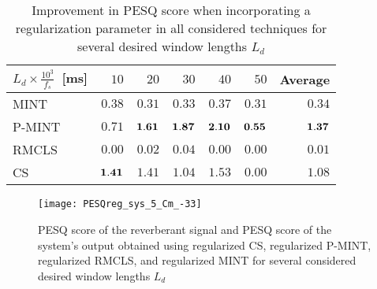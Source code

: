 \documentclass{article}
\begin{document}
\begin{table}[t!]
\footnotesize
\centering
\caption{Improvement in PESQ score when incorporating a regularization parameter in all considered techniques for several desired window lengths $L_d$}
\label{tbl: deltapesq}
 \begin{tabular}{|l|r|r|r|r|r|r|}
   \hline
   {\footnotesize $L_d \times \frac{10^{3}}{f_s}$~[ms] }& $10$ & $20$ & $30$ & $40$ & $50$ & Average \\ \hline
   MINT & $0.38$ & $0.31$ & $0.33$ & $0.37$ & $0.31$ & $0.34$ \\ \hline
   P-MINT & $0.71$ & $\bf{1.61}$ & $\bf{1.87}$ & $\bf{2.10}$ & $\bf{0.55}$ & $\bf{1.37}$ \\ \hline
   RMCLS & $0.00$ & $0.02$ & $0.04$ & $0.00$ & $0.00$ & $0.01$ \\ \hline
   CS & $\bf{1.41}$ & $1.41$ & $1.04$ & $1.53$ & $0.00$ & $1.08$ \\ \hline
\end{tabular}
\end{table}
\begin{figure}[t!]
\centering
\texttt{[image: PESQreg\_sys\_5\_Cm\_-33]}
\vspace{-0.8cm}
\caption{PESQ score of the reverberant signal and PESQ score of the system's output obtained using regularized CS, regularized P-MINT, regularized RMCLS, and regularized MINT for several considered desired window lengths $L_d$}
\vspace{-0.5cm}
\label{fig: PESQ}
\end{figure}
\end{document}
